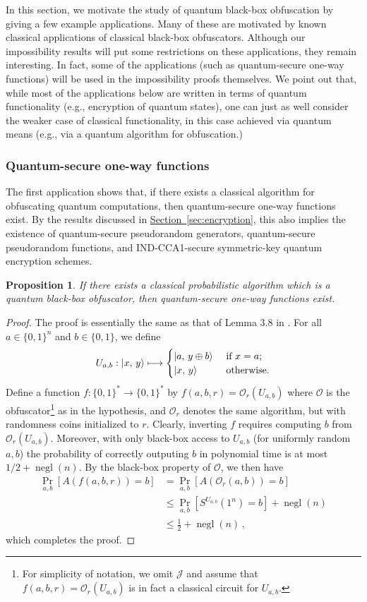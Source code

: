 \documentclass[11pt]{article}
\numberwithin{equation}{section}
\newtheorem{prop}{Proposition}
\newcommand{\opn}{\operatorname}
\newcommand{\expref}[2]{\texorpdfstring{\hyperref[#2]{#1~\ref{#2}}}{#1~\ref{#2}}}
\newcommand{\algo}{\mathcal}
\newcommand{\negl}{\opn{negl}}
\newcommand{\prob}{\opn{Pr}}
\begin{document}
In this section, we motivate the study of quantum black-box obfuscation by giving a few example applications. Many of these are motivated by known classical applications of classical black-box obfuscators. Although our impossibility results will put some restrictions on these applications, they remain interesting. In fact, some of the applications (such as quantum-secure one-way functions) will be used in the impossibility proofs themselves. We point out that, while most of the applications below are written in terms of quantum functionality (e.g., encryption of quantum states), one can just as well consider the weaker case of classical functionality, in this case achieved via quantum means (e.g., via a quantum algorithm for obfuscation.)

\subsubsection{Quantum-secure one-way functions}

The first application shows that, if there exists a classical algorithm for obfuscating quantum computations, then quantum-secure one-way functions exist. By the results discussed in \expref{Section}{sec:encryption}, this also implies the existence of quantum-secure pseudorandom generators, quantum-secure pseudorandom functions, and IND-CCA1-secure symmetric-key quantum encryption schemes.

\begin{prop}
If there exists a classical probabilistic algorithm which is a quantum black-box obfuscator, then quantum-secure one-way functions exist.
\end{prop}
\begin{proof}
The proof is essentially the same as that of Lemma 3.8 in \cite{BGIRSVY12}. For all $a \in \{0, 1\}^n$ and $b \in \{0, 1\}$, we define 
$$
U_{a, b} : {\left\vert{x,\, y}\right\rangle} \longmapsto
\begin{cases}
{\left\vert{a,\, y \oplus b}\right\rangle} &\text{ if } x = a;\\
{\left\vert{x,\, y}\right\rangle} &\text{ otherwise}.
\end{cases}
$$
Define a function $f : \{0, 1\}^* \rightarrow \{0, 1\}^*$ by $f(a, b, r) = \algo O_r(U_{a, b})$ where $\algo O$ is the obfuscator\footnote{For simplicity of notation, we omit $\algo J$ and assume that $f(a, b, r) = \algo O_r(U_{a, b})$ is in fact a classical circuit for $U_{a, b}$.} as in the hypothesis, and $\algo O_r$ denotes the same algorithm, but with randomness coins initialized to $r$. Clearly, inverting $f$ requires computing $b$ from $\algo O_r(U_{a, b})$. Moreover, with only black-box access to $U_{a, b}$ (for uniformly random $a, b$) the probability of correctly outputing $b$ in polynomial time is at most $1/2 + \negl(n)$.  By the black-box property of $\mathcal O$, we then have
\begin{align*}
\prob_{a, b} [ A(f(a, b, r)) = b] 
&= \prob_{a, b} [ A(\mathcal O_r(a, b)) = b ]\\
&\leq \prob_{a, b} \left[ S^{U_{a, b}}(1^n) = b\right] + \negl(n)\\
&\leq \frac{1}{2} + \negl(n)\,,
\end{align*}
which completes the proof.
\end{proof}
\end{document}
